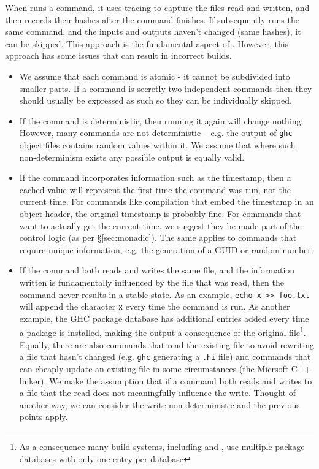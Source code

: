 When \Rattle runs a command, it uses tracing to capture the files read and written, and then records their hashes after the command finishes. If \Rattle subsequently runs the same command, and the inputs and outputs haven't changed (same hashes), it can be skipped. This approach is the fundamental aspect of \Fabricate\citep{fabricate}. However, this approach has some issues that can result in incorrect builds.

\begin{itemize}
\item We assume that each command is atomic - it cannot be subdivided into smaller parts. If a command is secretly two independent commands then they should usually be expressed as such so they can be individually skipped.
\item If the command is deterministic, then running it again will change nothing. However, many commands are not deterministic -- e.g. the output of \texttt{ghc} object files contains random values within it. We assume that where such non-determinism exists any possible output is equally valid.
\item If the command incorporates information such as the timestamp, then a cached value will represent the first time the command was run, not the current time. For commands like compilation that embed the timestamp in an object header, the original timestamp is probably fine. For commands that want to actually get the current time, we suggest they be made part of the control logic (as per \S\ref{sec:monadic}). The same applies to commands that require unique information, e.g. the generation of a GUID or random number.
\item If the command both reads and writes the same file, and the information written is fundamentally influenced by the file that was read, then the command never results in a stable state. As an example, \texttt{echo x >> foo.txt} will append the character \texttt{x} every time the command is run. As another example, the GHC package database has additional entries added every time a package is installed, making the output a consequence of the original file\footnote{As a consequence many build systems, including \Bazel and \Rattle, use multiple package databases with only one entry per database}. Equally, there are also commands that read the existing file to avoid rewriting a file that hasn't changed (e.g. \texttt{ghc} generating a \texttt{.hi} file) and commands that can cheaply update an existing file in some circumstances (the Micrsoft C++ linker). We make the assumption that if a command both reads and writes to a file that the read does not meaningfully influence the write. Thought of another way, we can consider the write non-deterministic and the previous points apply.

\end{itemize}
